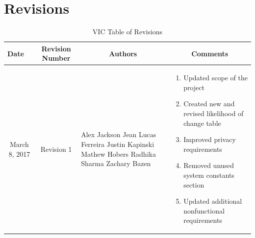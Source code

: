 \documentclass [11pt]{article}
\begin{document}

\section{Revisions}
\begin{longtable}{| p{ } | p{ } | p{ } | p{ } |}\caption{VIC Table of Revisions} \\\hline 

\centering \textbf{Date} & 
\multicolumn{1}{c|}{\textbf {Revision Number}} &
\multicolumn{1}{c|}{\textbf {Authors}} & 
\multicolumn{1}{c|}{\textbf {Comments}} \\ \hline



\multicolumn{1}{|c|}{\multirow{1}{*}{\centering March 8, 2017}}  & 
\multicolumn{1}{c|}{\multirow{1}{*}{Revision 1}} &
\begin{minipage}{.21\columnwidth}
    Alex Jackson \newline
    Jean Lucas Ferreira \newline
    Justin Kapinski\newline
    Mathew Hobers\newline
    Radhika Sharma\newline
    Zachary Bazen     
\end{minipage}&
\begin{minipage} {.27 \columnwidth}
    \begin{enumerate}[label = - , leftmargin=0.15in]
        \itemsep -.5em
        \item Updated scope of the project
        \item Created new and revised likelihood of change table
        \item Improved privacy requirements
        \item Removed unused system constants section
        \item Updated additional nonfunctional requirements\vspace{1mm}
    \end{enumerate}
\end{minipage}\\ \hline 



\end{longtable}
\end{document}
